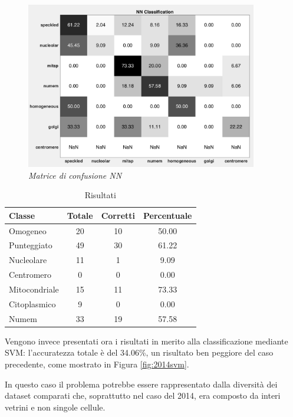 \begin{figure}[H] 
  \centering
    \includegraphics[width=0.9\textwidth]{images/conf_mat_2014_nn.png}
    \caption{{\small \textit{Matrice di confusione NN}}}
    \label{fig:2014nn}
\end{figure}

\begin{table}[H]
\centering
\footnotesize
\begin{tabular}{|l | c | c | c |} 
 \hline 
 \textbf{Classe} &  \textbf{Totale} & \textbf{Corretti} & \textbf{Percentuale} \\ [0.5ex] 
 \hline\hline
 Omogeneo & 20 & 10 & 50.00\\
 Punteggiato & 49 & 30 & 61.22\\
 Nucleolare & 11 & 1 & 9.09\\
 Centromero & 0 & 0 & 0.00\\
 Mitocondriale & 15 & 11 & 73.33\\
 Citoplasmico & 9 & 0 & 0.00\\
 Numem & 33 & 19 & 57.58\\
 \hline
\end{tabular}
\caption{Risultati}
\label{table:2014resnn}
\end{table}

Vengono invece presentati ora i risultati in merito alla classificazione mediante SVM: l'accuratezza totale è del 34.06\%, un risultato ben peggiore del caso precedente, come mostrato in Figura \ref{fig:2014svm}.

In questo caso il problema potrebbe essere rappresentato dalla diversità dei dataset comparati che, soprattutto nel caso del 2014, era composto da interi vetrini e non singole cellule.

